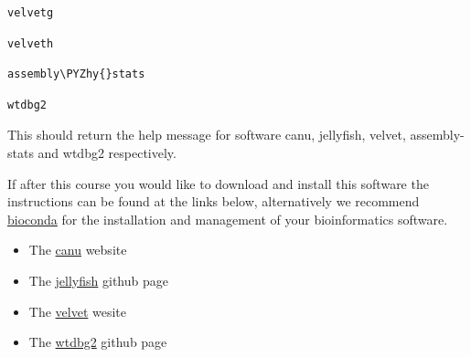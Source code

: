 \documentclass[11pt]{article}
\makeatletter
\providecommand{\tightlist}{%
      \setlength{\itemsep}{0pt}\setlength{\parskip}{0pt}}
\def\PYZhy{\char`\-}
\newcommand{\boxspacing}{\kern\kvtcb@left@rule\kern\kvtcb@boxsep}
\newcommand{\prompt}[4]{
        {\ttfamily\llap{{\color{#2}[#3]:\hspace{3pt}#4}}\vspace{-\baselineskip}}
    }
\makeatother
\begin{document}
    \begin{tcolorbox}[breakable, size=fbox, boxrule=1pt, pad at break*=1mm,colback=cellbackground, colframe=cellborder]
\prompt{In}{incolor}{ }{\boxspacing}
\begin{Verbatim}[commandchars=\\\{\}]
velvetg
\end{Verbatim}
\end{tcolorbox}

    \begin{tcolorbox}[breakable, size=fbox, boxrule=1pt, pad at break*=1mm,colback=cellbackground, colframe=cellborder]
\prompt{In}{incolor}{ }{\boxspacing}
\begin{Verbatim}[commandchars=\\\{\}]
velveth
\end{Verbatim}
\end{tcolorbox}

    \begin{tcolorbox}[breakable, size=fbox, boxrule=1pt, pad at break*=1mm,colback=cellbackground, colframe=cellborder]
\prompt{In}{incolor}{ }{\boxspacing}
\begin{Verbatim}[commandchars=\\\{\}]
assembly\PYZhy{}stats
\end{Verbatim}
\end{tcolorbox}

    \begin{tcolorbox}[breakable, size=fbox, boxrule=1pt, pad at break*=1mm,colback=cellbackground, colframe=cellborder]
\prompt{In}{incolor}{ }{\boxspacing}
\begin{Verbatim}[commandchars=\\\{\}]
wtdbg2
\end{Verbatim}
\end{tcolorbox}

    This should return the help message for software canu, jellyfish,
velvet, assembly-stats and wtdbg2 respectively.

If after this course you would like to download and install this
software the instructions can be found at the links below, alternatively
we recommend \href{https://bioconda.github.io/}{bioconda} for the
installation and management of your bioinformatics software.

\begin{itemize}
\tightlist
\item
  The \href{https://canu.readthedocs.io/en/latest/}{canu} website
\item
  The \href{https://github.com/gmarcais/Jellyfish}{jellyfish} github
  page
\item
  The \href{https://www.ebi.ac.uk/~zerbino/velvet/}{velvet} wesite
\item
  The \href{https://github.com/ruanjue/wtdbg2}{wtdbg2} github page
\end{itemize}
\end{document}

